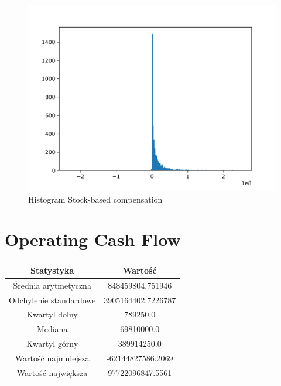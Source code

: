 \documentclass{article}
\begin{document}
\begin{figure}[h!]
    \includegraphics[width=\linewidth]{variables/Stock-based compensation.png}
    \caption{Histogram Stock-based compensation }
\end{figure}\section{ Operating Cash Flow }

\begin{center}
    \begin{tabular}{|c | c|} 
    \hline
    Statystyka & Wartość \\
    \hline\hline
    Średnia arytmetyczna & 848459804.751946 \\ 
    \hline
    Odchylenie standardowe & 3905164402.7226787 \\
    \hline
    Kwartyl dolny & 789250.0 \\
    \hline
    Mediana & 69810000.0 \\
    \hline
    Kwartyl górny & 389914250.0 \\
    \hline
    Wartość najmniejsza & -62144827586.2069 \\
    \hline
    Wartość największa & 97722096847.5561 \\
    \hline
   \end{tabular}
\end{center}
\end{document}
